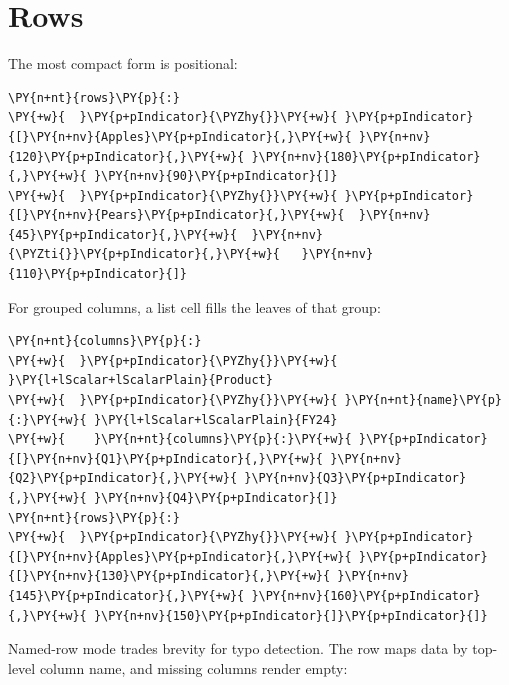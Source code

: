 \documentclass[a4paper,twoside]{article}
\begin{document}
\section{Rows}
The most compact form is positional:
\begin{tscode}[lang=yaml, engine=pygments]
\begin{Verbatim}[commandchars=\\\{\},breaklines, breakanywhere, commandchars=\\\{\}]
\PY{n+nt}{rows}\PY{p}{:}
\PY{+w}{  }\PY{p+pIndicator}{\PYZhy{}}\PY{+w}{ }\PY{p+pIndicator}{[}\PY{n+nv}{Apples}\PY{p+pIndicator}{,}\PY{+w}{ }\PY{n+nv}{120}\PY{p+pIndicator}{,}\PY{+w}{ }\PY{n+nv}{180}\PY{p+pIndicator}{,}\PY{+w}{ }\PY{n+nv}{90}\PY{p+pIndicator}{]}
\PY{+w}{  }\PY{p+pIndicator}{\PYZhy{}}\PY{+w}{ }\PY{p+pIndicator}{[}\PY{n+nv}{Pears}\PY{p+pIndicator}{,}\PY{+w}{  }\PY{n+nv}{45}\PY{p+pIndicator}{,}\PY{+w}{  }\PY{n+nv}{\PYZti{}}\PY{p+pIndicator}{,}\PY{+w}{   }\PY{n+nv}{110}\PY{p+pIndicator}{]}
\end{Verbatim}
\end{tscode}
For grouped columns, a list cell fills the leaves of that group:
\begin{tscode}[lang=yaml, engine=pygments]
\begin{Verbatim}[commandchars=\\\{\},breaklines, breakanywhere, commandchars=\\\{\}]
\PY{n+nt}{columns}\PY{p}{:}
\PY{+w}{  }\PY{p+pIndicator}{\PYZhy{}}\PY{+w}{ }\PY{l+lScalar+lScalarPlain}{Product}
\PY{+w}{  }\PY{p+pIndicator}{\PYZhy{}}\PY{+w}{ }\PY{n+nt}{name}\PY{p}{:}\PY{+w}{ }\PY{l+lScalar+lScalarPlain}{FY24}
\PY{+w}{    }\PY{n+nt}{columns}\PY{p}{:}\PY{+w}{ }\PY{p+pIndicator}{[}\PY{n+nv}{Q1}\PY{p+pIndicator}{,}\PY{+w}{ }\PY{n+nv}{Q2}\PY{p+pIndicator}{,}\PY{+w}{ }\PY{n+nv}{Q3}\PY{p+pIndicator}{,}\PY{+w}{ }\PY{n+nv}{Q4}\PY{p+pIndicator}{]}
\PY{n+nt}{rows}\PY{p}{:}
\PY{+w}{  }\PY{p+pIndicator}{\PYZhy{}}\PY{+w}{ }\PY{p+pIndicator}{[}\PY{n+nv}{Apples}\PY{p+pIndicator}{,}\PY{+w}{ }\PY{p+pIndicator}{[}\PY{n+nv}{130}\PY{p+pIndicator}{,}\PY{+w}{ }\PY{n+nv}{145}\PY{p+pIndicator}{,}\PY{+w}{ }\PY{n+nv}{160}\PY{p+pIndicator}{,}\PY{+w}{ }\PY{n+nv}{150}\PY{p+pIndicator}{]}\PY{p+pIndicator}{]}
\end{Verbatim}
\end{tscode}
Named-row mode trades brevity for typo detection. The row maps data by
top-level column name, and missing columns render empty:
\end{document}
